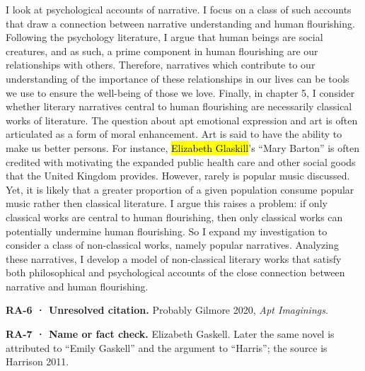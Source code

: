 \documentclass[
  letterpaper,
  DIV=11,
  numbers=noendperiod]{scrartcl}
\theoremstyle{remark}
\begin{document}
I look at psychological accounts of narrative. I focus on a class of
such accounts that draw a connection between narrative understanding and
human flourishing. Following the psychology literature, I argue that
human beings are social creatures, and as such, a prime component in
human flourishing are our relationships with others. Therefore,
narratives which contribute to our understanding of the importance of
these relationships in our lives can be tools we use to ensure the
well-being of those we love. Finally, in chapter 5, I consider whether
literary narratives central to human flourishing are necessarily
classical works of literature. The question about apt emotional
expression and art is often articulated as a form of moral enhancement.
Art is said to have the ability to make us better persons. For instance,
\hl{Elizabeth Glaskill}'s ``Mary Barton'' is often credited with
motivating the expanded public health care and other social goods that
the United Kingdom provides. However, rarely is popular music discussed.
Yet, it is likely that a greater proportion of a given population
consume popular music rather then classical literature. I argue this
raises a problem: if only classical works are central to human
flourishing, then only classical works can potentially undermine human
flourishing. So I expand my investigation to consider a class of
non-classical works, namely popular narratives. Analyzing these
narratives, I develop a model of non-classical literary works that
satisfy both philosophical and psychological accounts of the close
connection between narrative and human flourishing.

\begin{tcolorbox}[enhanced jigsaw, arc=.35mm, bottomrule=.15mm, bottomtitle=1mm, breakable, colback=white, colbacktitle=quarto-callout-warning-color!10!white, colframe=quarto-callout-warning-color-frame, coltitle=black, left=2mm, leftrule=.75mm, opacityback=0, opacitybacktitle=0.6, rightrule=.15mm, title=\textcolor{quarto-callout-warning-color}{\faExclamationTriangle}\hspace{0.5em}{Warning}, titlerule=0mm, toprule=.15mm, toptitle=1mm]

\textbf{RA-6 · Unresolved citation.} Probably Gilmore 2020, \emph{Apt
Imaginings}.

\end{tcolorbox}

\begin{tcolorbox}[enhanced jigsaw, arc=.35mm, bottomrule=.15mm, bottomtitle=1mm, breakable, colback=white, colbacktitle=quarto-callout-caution-color!10!white, colframe=quarto-callout-caution-color-frame, coltitle=black, left=2mm, leftrule=.75mm, opacityback=0, opacitybacktitle=0.6, rightrule=.15mm, title=\textcolor{quarto-callout-caution-color}{\faFire}\hspace{0.5em}{Caution}, titlerule=0mm, toprule=.15mm, toptitle=1mm]

\textbf{RA-7 · Name or fact check.} Elizabeth Gaskell. Later the same
novel is attributed to ``Emily Gaskell'' and the argument to ``Harris'';
the source is Harrison 2011.

\end{tcolorbox}
\end{document}
